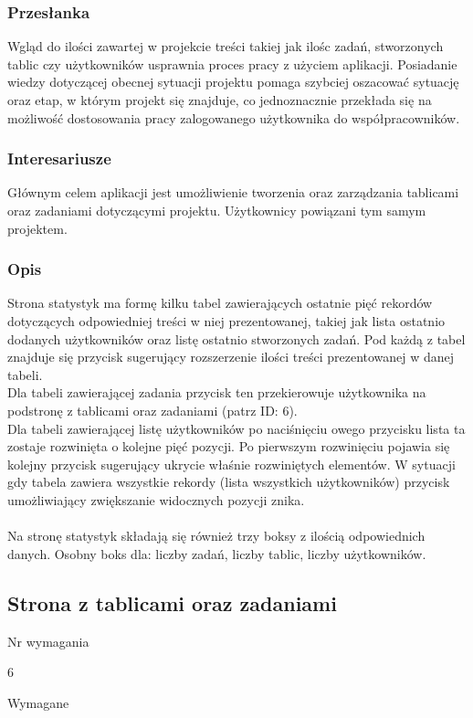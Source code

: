 \documentclass[eng,printmode]{mgr}
\begin{document}
\subsubsection{Przesłanka}
Wgląd do ilości zawartej w projekcie treści takiej jak ilośc zadań, stworzonych tablic czy użytkowników  usprawnia proces pracy z użyciem aplikacji. Posiadanie wiedzy dotyczącej obecnej sytuacji projektu pomaga szybciej oszacować sytuację oraz etap, w którym projekt się znajduje, co jednoznacznie przekłada się na możliwość dostosowania pracy zalogowanego użytkownika do współpracowników.

\subsubsection{Interesariusze}
Głównym celem aplikacji jest umożliwienie tworzenia oraz zarządzania tablicami oraz zadaniami dotyczącymi projektu. Użytkownicy powiązani tym samym projektem.

\subsubsection{Opis}
Strona statystyk ma formę kilku tabel zawierających ostatnie pięć rekordów dotyczących odpowiedniej treści w niej prezentowanej, takiej jak lista ostatnio dodanych użytkowników oraz listę ostatnio stworzonych zadań. Pod każdą z tabel znajduje się przycisk sugerujący rozszerzenie ilości treści prezentowanej w danej tabeli.
\\
Dla tabeli zawierającej zadania przycisk ten przekierowuje użytkownika na podstronę z tablicami oraz zadaniami (patrz ID: 6). 
\\
Dla tabeli zawierającej listę użytkowników po naciśnięciu owego przycisku lista ta zostaje rozwinięta o kolejne pięć pozycji. Po pierwszym rozwinięciu pojawia się kolejny przycisk sugerujący ukrycie właśnie rozwiniętych elementów. W sytuacji gdy tabela zawiera wszystkie rekordy (lista wszystkich użytkowników) przycisk umożliwiający zwiększanie widocznych pozycji znika.
\\ \\
Na stronę statystyk składają się również trzy boksy z ilością odpowiednich danych. Osobny boks dla: liczby zadań, liczby tablic, liczby użytkowników.

\subsection{Strona z tablicami oraz zadaniami}
\begin{labeling}{Nr wymagania}
\item [Nr wymagania:] 6
\item [Priorytet:] Wymagane
\end{labeling}
\end{document}
